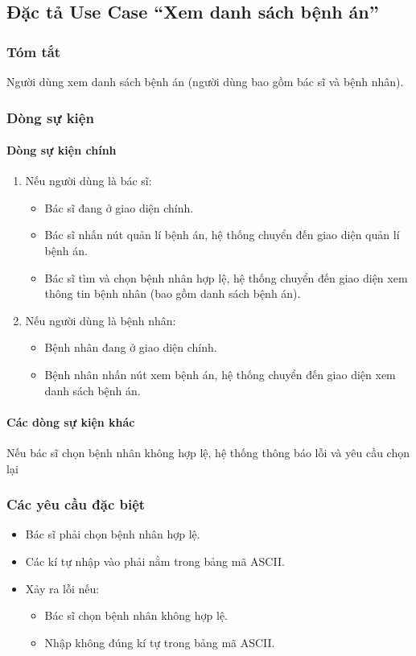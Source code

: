 \subsection{Đặc tả Use Case ``Xem danh sách bệnh án''}

\subsubsection{Tóm tắt}
Người dùng xem danh sách bệnh án (người dùng bao gồm bác sĩ và bệnh nhân).

\subsubsection{Dòng sự kiện}
\paragraph{\textbf{Dòng sự kiện chính}}
\begin{enumerate}
  \item Nếu người dùng là bác sĩ:
    \begin{itemize}
      \item Bác sĩ đang ở giao diện chính.
      \item Bác sĩ nhấn nút quản lí bệnh án, hệ thống chuyển đến giao diện quản lí bệnh án.
      \item Bác sĩ tìm và chọn bệnh nhân hợp lệ, hệ thống chuyển đến giao diện xem thông tin bệnh nhân (bao gồm danh sách bệnh án).
    \end{itemize}
  \item Nếu người dùng là bệnh nhân:
    \begin{itemize}
      \item Bệnh nhân đang ở giao diện chính.
      \item Bệnh nhân nhấn nút xem bệnh án, hệ thống chuyển đến giao diện xem danh sách bệnh án.
    \end{itemize}
\end{enumerate}

\paragraph{\textbf{Các dòng sự kiện khác}}
Nếu bác sĩ chọn bệnh nhân không hợp lệ, hệ thống thông báo lỗi và yêu cầu chọn lại

\subsubsection{Các yêu cầu đặc biệt}
\begin{itemize}
  \item Bác sĩ phải chọn bệnh nhân hợp lệ.
  \item Các kí tự nhập vào phải nằm trong bảng mã ASCII.
  \item Xảy ra lỗi nếu:
    \begin{itemize}
      \item Bác sĩ chọn bệnh nhân không hợp lệ.
      \item Nhập không đúng kí tự trong bảng mã ASCII.
    \end{itemize}
\end{itemize}

